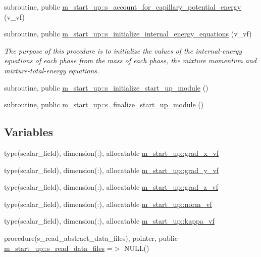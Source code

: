 \begin{DoxyCompactItemize}
subroutine, public \hyperlink{namespacem__start__up_a7e47c12de90e408e70de7da3f2d24e28}{m\+\_\+start\+\_\+up\+::s\+\_\+account\+\_\+for\+\_\+capillary\+\_\+potential\+\_\+energy} (v\+\_\+vf)
\item 
subroutine, public \hyperlink{namespacem__start__up_a38182f7fcc92c1c687840339a20e85cd}{m\+\_\+start\+\_\+up\+::s\+\_\+initialize\+\_\+internal\+\_\+energy\+\_\+equations} (v\+\_\+vf)
\begin{DoxyCompactList}\small\item\em The purpose of this procedure is to initialize the values of the internal-\/energy equations of each phase from the mass of each phase, the mixture momentum and mixture-\/total-\/energy equations. \end{DoxyCompactList}\item 
subroutine, public \hyperlink{namespacem__start__up_a37202711d89d04cd18f08170ba608aa1}{m\+\_\+start\+\_\+up\+::s\+\_\+initialize\+\_\+start\+\_\+up\+\_\+module} ()
\item 
subroutine, public \hyperlink{namespacem__start__up_a65fd279db64882a3732a0549ec74e335}{m\+\_\+start\+\_\+up\+::s\+\_\+finalize\+\_\+start\+\_\+up\+\_\+module} ()
\end{DoxyCompactItemize}
\subsection*{Variables}
\begin{DoxyCompactItemize}
\item 
type(scalar\+\_\+field), dimension(\+:), allocatable \hyperlink{namespacem__start__up_acd3b736578c59b1bd9dfc4b81f4a7279}{m\+\_\+start\+\_\+up\+::grad\+\_\+x\+\_\+vf}
\item 
type(scalar\+\_\+field), dimension(\+:), allocatable \hyperlink{namespacem__start__up_a2e9ad6009d63488a8f8c7a3a548ba433}{m\+\_\+start\+\_\+up\+::grad\+\_\+y\+\_\+vf}
\item 
type(scalar\+\_\+field), dimension(\+:), allocatable \hyperlink{namespacem__start__up_ada153b7f1b2f725b026b89cd187d3206}{m\+\_\+start\+\_\+up\+::grad\+\_\+z\+\_\+vf}
\item 
type(scalar\+\_\+field), dimension(\+:), allocatable \hyperlink{namespacem__start__up_ae380781597535aa125ff18847b85a206}{m\+\_\+start\+\_\+up\+::norm\+\_\+vf}
\item 
type(scalar\+\_\+field), dimension(\+:), allocatable \hyperlink{namespacem__start__up_a7744b5bc78146b1334d0c019d83c985e}{m\+\_\+start\+\_\+up\+::kappa\+\_\+vf}
\item 
procedure(s\+\_\+read\+\_\+abstract\+\_\+data\+\_\+files), pointer, public \hyperlink{namespacem__start__up_a76bcd559339a2dac17d36b71eb912556}{m\+\_\+start\+\_\+up\+::s\+\_\+read\+\_\+data\+\_\+files} =$>$ N\+U\+LL()
\end{DoxyCompactItemize}


